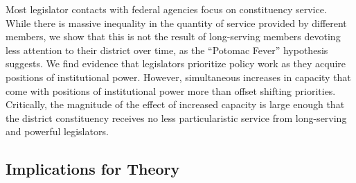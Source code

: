 \documentclass[12pt]{article}
\begin{document}





Most legislator contacts with federal agencies focus on constituency service. While there is massive inequality in the quantity of service provided by different members, we show that this is not the result of long-serving members devoting less attention to their district over time, as the ``Potomac Fever'' hypothesis suggests. We find evidence that legislators prioritize policy work as they acquire positions of institutional power. However, simultaneous increases in capacity that come with positions of institutional power more than offset shifting priorities. Critically, the magnitude of the effect of increased capacity is large enough that the district constituency receives no less particularistic service from long-serving and powerful legislators. 


\subsection{Implications for Theory}
\end{document}
